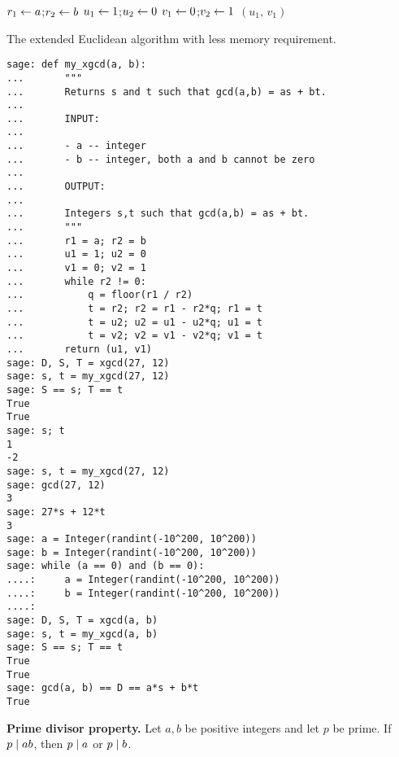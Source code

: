 \begin{algorithm}[!htbp]
\dontprintsemicolon
\BlankLine
$r_1 \leftarrow a$;\quad $r_2 \leftarrow b$\;
$u_1 \leftarrow 1$;\quad $u_2 \leftarrow 0$\;
$v_1 \leftarrow 0$;\quad $v_2 \leftarrow 1$\;
\Return $(u_1,\, v_1)$
\caption{The extended Euclidean algorithm with less memory
  requirement.}
\label{alg:unique_factorization:extended_GCD_memory_efficient}
\end{algorithm}

\begin{lstlisting}
sage: def my_xgcd(a, b):
...       """
...       Returns s and t such that gcd(a,b) = as + bt.
...
...       INPUT:
...
...       - a -- integer
...       - b -- integer, both a and b cannot be zero
...
...       OUTPUT:
...
...       Integers s,t such that gcd(a,b) = as + bt.
...       """
...       r1 = a; r2 = b
...       u1 = 1; u2 = 0
...       v1 = 0; v2 = 1
...       while r2 != 0:
...           q = floor(r1 / r2)
...           t = r2; r2 = r1 - r2*q; r1 = t
...           t = u2; u2 = u1 - u2*q; u1 = t
...           t = v2; v2 = v1 - v2*q; v1 = t
...       return (u1, v1)
sage: D, S, T = xgcd(27, 12)
sage: s, t = my_xgcd(27, 12)
sage: S == s; T == t
True
True
sage: s; t
1
-2
sage: s, t = my_xgcd(27, 12)
sage: gcd(27, 12)
3
sage: 27*s + 12*t
3
sage: a = Integer(randint(-10^200, 10^200))
sage: b = Integer(randint(-10^200, 10^200))
sage: while (a == 0) and (b == 0):
....:     a = Integer(randint(-10^200, 10^200))
....:     b = Integer(randint(-10^200, 10^200))
....:
sage: D, S, T = xgcd(a, b)
sage: s, t = my_xgcd(a, b)
sage: S == s; T == t
True
True
sage: gcd(a, b) == D == a*s + b*t
True
\end{lstlisting}

\begin{corollary}
\label{cor:unique_factorization:prime_divisor_property}
\textbf{Prime divisor property.}
Let $a,b$ be positive integers and let $p$ be prime. If $p \;|\; ab$,
then $p \;|\; a$ or $p \;|\; b$.
\end{corollary}

